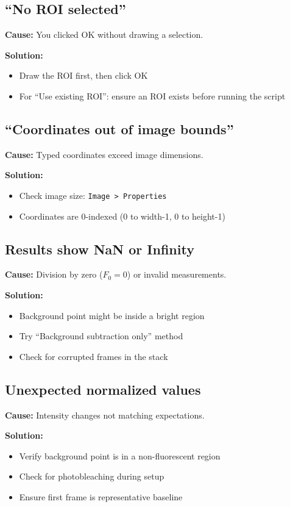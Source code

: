 \documentclass[11pt,a4paper]{article}
\begin{document}
\subsection{``No ROI selected''}

\textbf{Cause:} You clicked OK without drawing a selection.

\textbf{Solution:}
\begin{itemize}
    \item Draw the ROI first, then click OK
    \item For ``Use existing ROI'': ensure an ROI exists before running the script
\end{itemize}

\subsection{``Coordinates out of image bounds''}

\textbf{Cause:} Typed coordinates exceed image dimensions.

\textbf{Solution:}
\begin{itemize}
    \item Check image size: \texttt{Image > Properties}
    \item Coordinates are 0-indexed (0 to width-1, 0 to height-1)
\end{itemize}

\subsection{Results show NaN or Infinity}

\textbf{Cause:} Division by zero ($F_0 = 0$) or invalid measurements.

\textbf{Solution:}
\begin{itemize}
    \item Background point might be inside a bright region
    \item Try ``Background subtraction only'' method
    \item Check for corrupted frames in the stack
\end{itemize}

\subsection{Unexpected normalized values}

\textbf{Cause:} Intensity changes not matching expectations.

\textbf{Solution:}
\begin{itemize}
    \item Verify background point is in a non-fluorescent region
    \item Check for photobleaching during setup
    \item Ensure first frame is representative baseline
\end{itemize}
\end{document}
